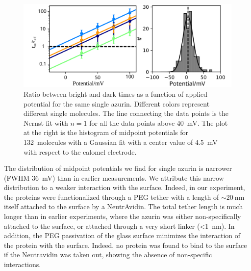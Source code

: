 \begin{figure}
	\centering
	\includegraphics[width=\textwidth]{Figure_2_midpoint}
	\caption{Ratio between bright and dark times as a function of applied potential for the same single azurin.
	Different colors represent different single molecules.
	The line connecting the data points is the Nernst fit with $n=1$ for all the data points above \SI{40}{\mV}.
	The plot at the right is the histogram of midpoint potentials for \SI{132}{ molecules} with a Gaussian fit with a center value of \SI{4.5}{\mV} with respect to the calomel electrode.}
	\label{fig:midpoint}
\end{figure}

The distribution of midpoint potentials we find for single azurin is narrower (FWHM \SI{36}{\mV}) than in earlier measurements. We attribute this narrow distribution to a weaker interaction with the surface. Indeed, in our experiment, the proteins were functionalized through a PEG tether with a length of ${\sim}\SI{20}{\nm}$ itself attached to the surface by a NeutrAvidin. The total tether length is much longer than in earlier experiments, where the azurin was either non-specifically attached to the surface, or attached through a very short linker (\SI{<1}{\nm}).
In addition, the PEG passivation of the glass surface minimizes the interaction of the protein with the surface. Indeed, no protein was found to bind to the surface if the Neutravidin was taken out, showing the absence of non-specific interactions.

